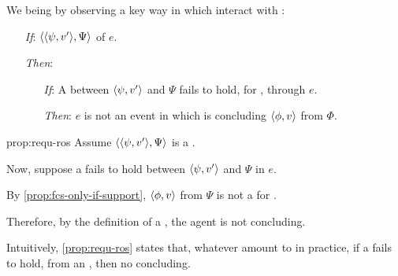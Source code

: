 \begin{note}
  We being by observing a key way in which  interact with :

  \begin{proposition}
    \label{prop:requ-ros}

    \begin{itemize}
    \item[\emph{If}:]
      \(\langle \langle \psi, v' \rangle, \Psi \rangle\) \requ{} of \(e\).
    \item[\emph{Then}:]
      \begin{itemize}
      \item[\emph{If}:]
        A \ros{} between \(\langle \psi, v' \rangle\) and \(\Psi\) fails to hold, for \vAgent{}, through \(e\).
      \item[\emph{Then}:]
        \(e\) is not an event in which \vAgent{} is concluding \(\langle \phi, v \rangle\) from \(\Phi\).
      \end{itemize}
    \end{itemize}
    \vspace{-\baselineskip}
  \end{proposition}

  \begin{argument}{prop:requ-ros}
    Assume \(\langle \langle \psi, v' \rangle, \Psi \rangle\) is a \requ{}.

    Now, suppose a \ros{} fails to hold between \(\langle \psi, v' \rangle\) and \(\Psi\) in \(e\).

    By \autoref{prop:fcs-only-if-support}, \(\langle \phi, v \rangle\) from \(\Psi\) is not a \fc{} for \vAgent{}.

    Therefore, by the definition of a \requ{}, the agent is not concluding.
  \end{argument}
\end{note}

\begin{note}
  Intuitively, \autoref{prop:requ-ros} states that, whatever  amount to in practice, if a \ros{} fails to hold, from an \agpe{}, then no concluding.

\end{note}

